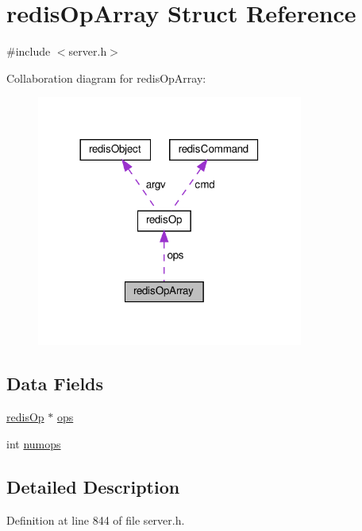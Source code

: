 \hypertarget{structredis_op_array}{}\section{redis\+Op\+Array Struct Reference}
\label{structredis_op_array}


{\ttfamily \#include $<$server.\+h$>$}



Collaboration diagram for redis\+Op\+Array\+:
\nopagebreak
\begin{figure}[H]
\begin{center}
\leavevmode
\includegraphics[width=248pt]{structredis_op_array__coll__graph}
\end{center}
\end{figure}
\subsection*{Data Fields}
\begin{DoxyCompactItemize}
\item 
\hyperlink{structredis_op}{redis\+Op} $\ast$ \hyperlink{structredis_op_array_a8a0d6869823f5a12e276fe2f7473f60f}{ops}
\item 
int \hyperlink{structredis_op_array_aa2e11274504033ec9d5501c462f9fbaa}{numops}
\end{DoxyCompactItemize}


\subsection{Detailed Description}


Definition at line 844 of file server.\+h.



